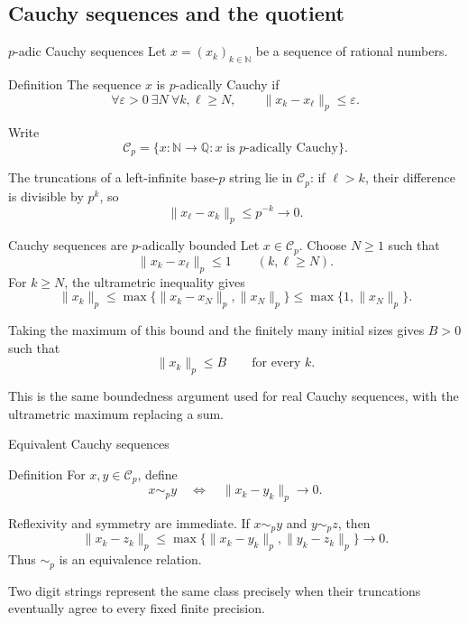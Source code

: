 \documentclass[aspectratio=169,11pt]{beamer}
\newcommand{\N}{\mathbb N}
\newcommand{\Q}{\mathbb Q}
\begin{document}
\subsection{Cauchy sequences and the quotient}

\begin{frame}{\(p\)-adic Cauchy sequences}
  Let \(x=(x_k)_{k\in\N}\) be a sequence of rational numbers.

  \begin{block}{Definition}
    The sequence \(x\) is \alert{\(p\)-adically Cauchy} if
    \[
      \forall\varepsilon>0\ \exists N\ \forall k,\ell\ge N,
      \qquad \|x_k-x_\ell\|_p\le\varepsilon.
    \]
  \end{block}

  Write
  \[
    \mathcal C_p
      =\{x\colon\N\to\Q:x\text{ is \(p\)-adically Cauchy}\}.
  \]

  The truncations of a left-infinite base-\(p\) string lie in
  \(\mathcal C_p\): if \(\ell>k\), their difference is divisible by
  \(p^k\), so
  \[
    \|x_\ell-x_k\|_p\le p^{-k}\longrightarrow0.
  \]
\end{frame}

\begin{frame}{Cauchy sequences are \(p\)-adically bounded}
  Let \(x\in\mathcal C_p\).  Choose \(N\ge1\) such that
  \[
    \|x_k-x_\ell\|_p\le1
    \qquad(k,\ell\ge N).
  \]
  For \(k\ge N\), the ultrametric inequality gives
  \[
    \|x_k\|_p
      \le\max\{\|x_k-x_N\|_p,\|x_N\|_p\}
      \le\max\{1,\|x_N\|_p\}.
  \]

  Taking the maximum of this bound and the finitely many initial sizes gives
  \(B>0\) such that
  \[
    \boxed{\|x_k\|_p\le B\qquad\text{for every }k.}
  \]

  This is the same boundedness argument used for real Cauchy sequences, with
  the ultrametric maximum replacing a sum.
\end{frame}

\begin{frame}{Equivalent Cauchy sequences}
  \begin{block}{Definition}
    For \(x,y\in\mathcal C_p\), define
    \[
      x\sim_p y
      \quad\Longleftrightarrow\quad
      \|x_k-y_k\|_p\longrightarrow0.
    \]
  \end{block}

  Reflexivity and symmetry are immediate.  If \(x\sim_p y\) and
  \(y\sim_p z\), then
  \[
    \|x_k-z_k\|_p
      \le\max\{\|x_k-y_k\|_p,\|y_k-z_k\|_p\}
      \longrightarrow0.
  \]
  Thus \(\sim_p\) is an equivalence relation.

  Two digit strings represent the same class precisely when their
  truncations eventually agree to every fixed finite precision.
\end{frame}
\end{document}
